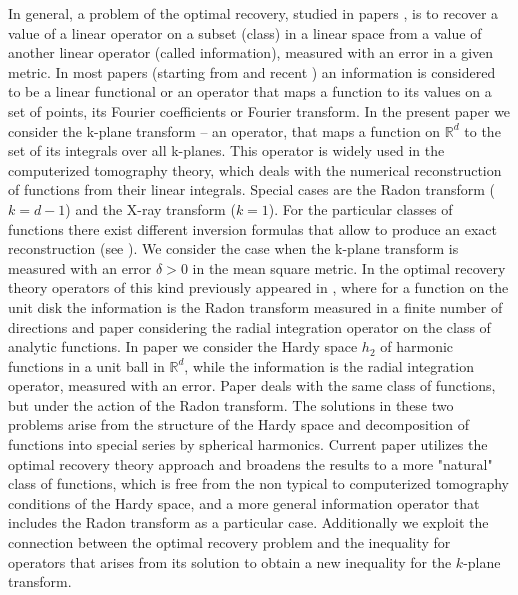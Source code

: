 \documentclass[12pt]{iopart}
\begin{document}
	In general, a problem of the optimal recovery, studied in papers \cite{SM,MR,MR1}, is to recover a value of a linear operator on a subset (class) in a linear space from a value of another linear operator (called information), measured with an error in a given metric. In most papers (starting from \cite{O} and recent \cite{OS,MO3}) an information is considered to be a linear functional or an operator that maps a function to its values on a set of points, its Fourier coefficients or Fourier transform. In the present paper we consider the k-plane transform -- an operator, that maps a function on $\mathbb R^d$ to the set of its integrals over all k-planes. This operator is widely used in the computerized tomography theory, which deals with the numerical reconstruction of functions from their linear integrals. Special cases are the Radon transform ($k=d-1$) and the X-ray transform ($k=1$). For the particular classes of functions there exist different inversion formulas that allow to produce an exact reconstruction (see \cite{Na}). We consider the case when the k-plane transform is measured with an error $\delta>0$ in the mean square metric. In the optimal recovery theory operators of this kind previously appeared in \cite{LS}, where for a function on the unit disk the information is the Radon transform measured in a finite number of directions and paper \cite{D} considering the radial integration operator on the class of analytic functions. In paper \cite{B} we consider the Hardy space $h_2$ of harmonic functions in a unit ball in $\mathbb R^d$, while the information is the radial integration operator, measured with an error. Paper \cite{B1} deals with the same class of functions, but under the action of the Radon transform. The solutions in these two problems arise from the structure of the Hardy space and decomposition of functions into special series by spherical harmonics. Current paper utilizes the optimal recovery theory approach and broadens the results to a more "natural" class of functions, which is free from the non typical to computerized tomography conditions of the Hardy space, and a more general information operator that includes the Radon transform as a particular case. Additionally we exploit the connection between the optimal recovery problem and the inequality for operators that arises from its solution to obtain a new inequality for the $k$-plane transform.
	
\end{document}
